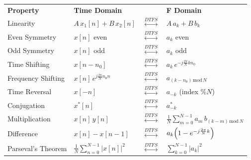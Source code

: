 \documentclass[twocolumn]{article}
\begin{document}
\begin{table}[ht]
    \centering
    \begin{tabular}{llll}
        \textbf{Property}  & \textbf{Time Domain}                    &                                     & \textbf{F Domain}                                               \\
        Linearity          & \(A\,x_1[n] + B\,x_2[n]\)               & \(\overset{DTFS}{\leftrightarrow}\) & \(A\,a_k + B\,b_k\)                                             \\
        Even Symmetry      & \(x[n]\) even                           & \(\overset{DTFS}{\leftrightarrow}\) & \(a_k\) even                                                    \\
        Odd Symmetry       & \(x[n]\) odd                            & \(\overset{DTFS}{\leftrightarrow}\) & \(a_k\) odd                                                     \\
        Time Shifting      & \(x[n-n_0]\)                            & \(\overset{DTFS}{\leftrightarrow}\) & \(a_k\,e^{-j\frac{2\pi}{N} k n_0}\)                             \\
        Frequency Shifting & \(x[n]\,e^{j\frac{2\pi}{N} n_0 n}\)     & \(\overset{DTFS}{\leftrightarrow}\) & \(a_{(k-n_0)\,\mathrm{mod}\,N}\)                                \\
        Time Reversal      & \(x[-n]\)                               & \(\overset{DTFS}{\leftrightarrow}\) & \(a_{-k}\) (index  \%\(N\))                                  \\
        Conjugation        & \(x^*[n]\)                              & \(\overset{DTFS}{\leftrightarrow}\) & \(a^*_{-k}\)                                                    \\
        Multiplication     & \(x[n]\,y[n]\)                          & \(\overset{DTFS}{\leftrightarrow}\) & \(\frac{1}{N}\sum_{m=0}^{N-1} a_m\,b_{(k-m)\,\mathrm{mod}\,N}\) \\
        Difference         & \(x[n]-x[n-1]\)                         & \(\overset{DTFS}{\leftrightarrow}\) & \(a_k\Bigl(1-e^{-j\frac{2\pi}{N} k}\Bigr)\)                     \\
        Parseval's Theorem & \(\frac{1}{N}\sum_{n=0}^{N-1}|x[n]|^2\) & \(\overset{DTFS}{\leftrightarrow}\) & \(\sum_{k=0}^{N-1}|a_k|^2\)                                     \\
    \end{tabular}
\end{table}
\end{document}
